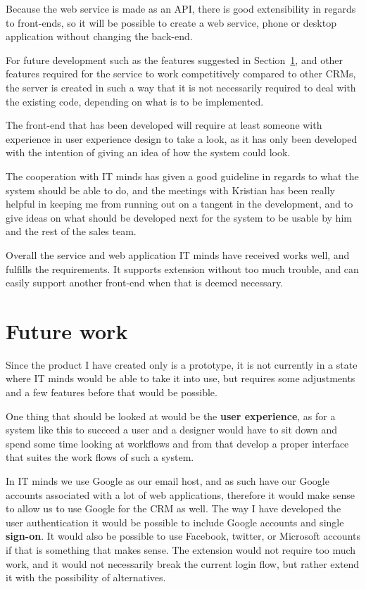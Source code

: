 Because the web service is made as an API, there is good extensibility in regards
to front-ends, so it will be possible to create a web service, phone or desktop
application without changing the back-end.

For future development such as the features suggested in
Section~\ref{sec:future_work}, and other features required for the service to
work competitively compared to other CRMs, the server is created in such a way
that it is not necessarily required to deal with the existing code, depending on
what is to be implemented.

The front-end that has been developed will require at least someone with
experience in user experience design to take a look, as it has only been
developed with the intention of giving an idea of how the system could look.

The cooperation with IT minds has given a good guideline in regards to what the
system should be able to do, and the meetings with Kristian has been really
helpful in keeping me from running out on a tangent in the development, and to
give ideas on what should be developed next for the system to be usable by him
and the rest of the sales team.

Overall the service and web application IT minds have received works well, and
fulfills the requirements. It supports extension without too much trouble, and
can easily support another front-end when that is deemed necessary.

\section{Future work}
\label{sec:future_work}
Since the product I have created only is a prototype, it is not currently in a
state where IT minds would be able to take it into use, but requires some
adjustments and a few features before that would be possible.

One thing that should be looked at would be the \textbf{user experience}, as for a system
like this to succeed a user and a designer would have to sit down and spend
some time looking at workflows and from that develop a proper interface that
suites the work flows of such a system.

In IT minds we use Google as our email host, and as such have our Google
accounts associated with a lot of web applications, therefore it would make sense to
allow us to use Google for the CRM as well. The way I have developed the user
authentication it would be possible to include Google accounts and single
\textbf{sign-on}. It would also be possible to use Facebook, twitter, or Microsoft accounts if that
is something that makes sense. The extension would not require too much work,
and it would not necessarily break the current login flow, but rather extend it
with the possibility of alternatives.

